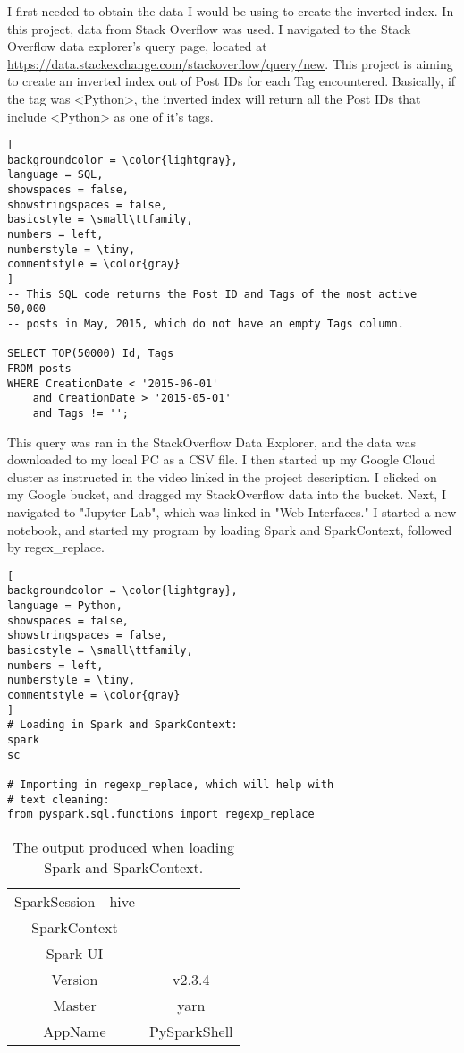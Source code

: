 \documentclass[]{article}
\begin{document}
I first needed to obtain the data I would be using to create the inverted index.  In this project, data from Stack Overflow was used.  I navigated to the Stack Overflow data explorer's query page, located at \url{https://data.stackexchange.com/stackoverflow/query/new}.  This project is aiming to create an inverted index out of Post IDs for each Tag encountered.  Basically, if the tag was <Python>, the inverted index will return all the Post IDs that include <Python> as one of it's tags.   
\begin{lstlisting}[
backgroundcolor = \color{lightgray},
language = SQL,
showspaces = false,
showstringspaces = false,
basicstyle = \small\ttfamily,
numbers = left,
numberstyle = \tiny,
commentstyle = \color{gray}
]
-- This SQL code returns the Post ID and Tags of the most active 50,000
-- posts in May, 2015, which do not have an empty Tags column.

SELECT TOP(50000) Id, Tags
FROM posts
WHERE CreationDate < '2015-06-01'
	and CreationDate > '2015-05-01'
	and Tags != '';
\end{lstlisting}

This query was ran in the StackOverflow Data Explorer, and the data was downloaded to my local PC as a CSV file.  I then started up my Google Cloud cluster as instructed in the video linked in the project description.  I clicked on my Google bucket, and dragged my StackOverflow data into the bucket.  Next, I navigated to "Jupyter Lab", which was linked in "Web Interfaces." I started a new notebook, and started my program by loading Spark and SparkContext, followed by regex\_replace.  


\begin{lstlisting}[
backgroundcolor = \color{lightgray},
language = Python,
showspaces = false,
showstringspaces = false,
basicstyle = \small\ttfamily,
numbers = left,
numberstyle = \tiny,
commentstyle = \color{gray}
]
# Loading in Spark and SparkContext:
spark
sc

# Importing in regexp_replace, which will help with
# text cleaning:
from pyspark.sql.functions import regexp_replace
\end{lstlisting}

\begin{table}[!ht]
	\begin{center}
		\caption{The output produced when loading Spark and SparkContext.}
		\label{tab:table1}
		\begin{tabular}{|cc|} 
			\hline
			SparkSession - hive &\\
			SparkContext & \\
			Spark UI & \\
			Version & v2.3.4\\
			Master & yarn\\
			AppName & PySparkShell\\
			\hline
		\end{tabular}
	\end{center}
\end{table}
\end{document}
